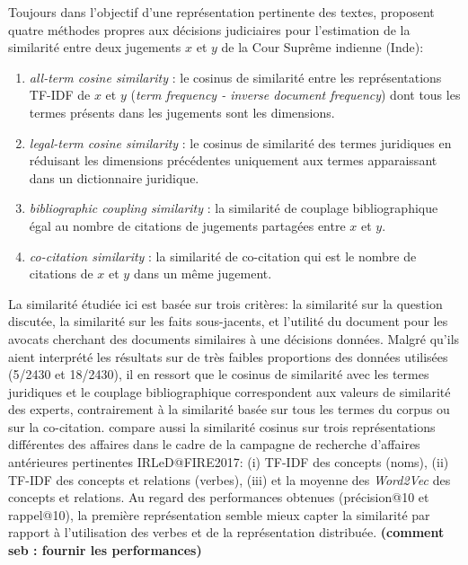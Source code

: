Toujours dans l'objectif d'une représentation pertinente des textes, \citet{kumar2011judgmentsimilarity} proposent quatre méthodes propres aux décisions judiciaires pour l'estimation de la similarité entre deux jugements  $x$ et $y$ de la Cour Suprême indienne (Inde):
\begin{enumerate}
\item \textit{all-term cosine similarity} : le cosinus de similarité entre les représentations TF-IDF de $x$ et $y$ (\textit{term frequency - inverse document frequency}) dont tous les termes présents dans les jugements sont les dimensions.
\item \textit{legal-term cosine similarity} : le cosinus de similarité des termes juridiques en réduisant les dimensions précédentes uniquement aux termes apparaissant dans un dictionnaire juridique.
\item  \textit{bibliographic coupling similarity} : la similarité de couplage bibliographique égal au nombre de citations de jugements partagées entre $x$ et $y$.
\item \textit{co-citation similarity} : la similarité de co-citation qui est le nombre de citations de $x$ et $y$ dans un même jugement. 
\end{enumerate}

 La similarité étudiée ici est basée sur trois critères: la similarité sur la question discutée, la similarité sur les faits sous-jacents, et l'utilité du document pour les avocats cherchant des documents similaires à une décisions données. Malgré qu'ils aient interprété les résultats sur de très faibles proportions des données utilisées (5/2430 et 18/2430), il en ressort que le cosinus de similarité avec les termes juridiques et le couplage bibliographique correspondent aux valeurs de similarité des experts, contrairement à la similarité basée sur tous les termes du corpus ou sur la co-citation. \citet{thenmozhi2017legalprecedretriev} compare aussi la similarité cosinus sur trois représentations différentes des affaires dans le cadre de la campagne de recherche d'affaires antérieures pertinentes  IRLeD@FIRE2017: (i) TF-IDF des concepts (noms), (ii) TF-IDF des concepts et relations (verbes), (iii) et la moyenne des \textit{Word2Vec} \citep{lemikolov2014word2vec} des concepts et relations. Au regard des performances obtenues (précision@10 et rappel@10), la première représentation semble mieux capter la similarité par rapport à l'utilisation des verbes et de la représentation distribuée. \textbf{(comment seb : fournir les performances)}

